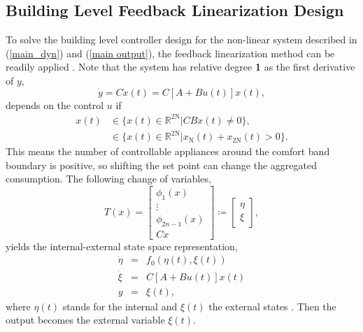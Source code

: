 \documentclass[journal]{IEEEtran}
\begin{document}
\subsection{Building Level Feedback Linearization Design}
To solve the building level controller design for the non-linear system described in (\ref{main_dyn}) and (\ref{main output}), the feedback linearization method can be readily applied \cite{khalil}. Note that the system has relative degree \textbf{1} as the first derivative of $y$,
\begin{equation}
\dot{y}=C\dot{x}(t)= C[A+Bu(t)]x(t),
\end{equation}
depends on the control $u$ if  
\begin{displaymath}
\begin{array}{rl}
x(t) & \in \{x(t)\in\mathbb{R}^{\textrm{2N}}|CBx(t)\neq 0\},\\
& \in \{x(t)\in\mathbb{R}^{\textrm{2N}}|x_{\textrm{N}}(t)+x_{\textrm{2N}}(t) > 0\}.
\end{array}
\end{displaymath}
This means the number of controllable appliances around the comfort band boundary is positive, so shifting the set point can change the aggregated consumption. The following change of variables,
\begin{equation}
T(x)=\left[
\begin{array}{c}
\phi_{1}(x)\\
\vdots\\
\phi_{2n-1}(x)\\
Cx
\end{array}
\right] \coloneqq \left[
\begin{array}{c}
\eta\\
\xi
\end{array}
\right],
\end{equation}
yields the internal-external state space representation,
\begin{equation}
\begin{array}{lll}
\dot{\eta} & = & f_{0}(\eta(t),\xi(t))\\
\dot{\xi} & = & C[A+Bu(t)]x(t) \\
y & = & \xi(t) ,
\end{array}
\end{equation} 
where $\eta(t)$ stands for the internal and $\xi(t)$ the external states \cite{khalil}. Then the output becomes the external variable $\xi(t)$.
\end{document}
